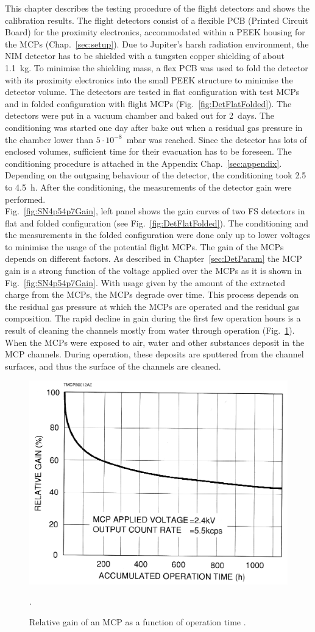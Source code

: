 	This chapter describes the testing procedure of the flight detectors and shows the calibration results. The flight detectors consist of a flexible PCB (Printed Circuit Board) for the proximity electronics, accommodated within a PEEK housing for the MCPs (Chap.~\ref{sec:setup}). Due to Jupiter's harsh radiation environment, the NIM detector has to be shielded with a tungsten copper shielding of about 1.1~kg. To minimise the shielding mass, a flex PCB was used to fold the detector with its proximity electronics into the small PEEK structure to minimise the detector volume. The detectors are tested in flat configuration with test MCPs and in folded configuration with flight MCPs (Fig.~\ref{fig:DetFlatFolded}). The detectors were put in a vacuum chamber and baked out for 2~days. The conditioning was started one day after bake out when a residual gas pressure in the chamber lower than $5\cdot10^{-8}$~mbar was reached. Since the detector has lots of enclosed volumes, sufficient time for their evacuation has to be foreseen. The conditioning procedure is attached in the Appendix Chap.~\ref{sec:appendix}. Depending on the outgasing behaviour of the detector, the conditioning took 2.5 to 4.5~h. After the conditioning, the measurements of the detector gain were performed.\\
	Fig.~\ref{fig:SN4p54p7Gain}, left panel shows the gain curves of two FS detectors in flat and folded configuration (see Fig.~\ref{fig:DetFlatFolded}). The conditioning and the measurements in the folded configuration were done only up to lower voltages to minimise the usage of the potential flight MCPs. The gain of the MCPs depends on different factors. As described in Chapter~\ref{sec:DetParam} the MCP gain is a strong function of the voltage applied over the MCPs as it is shown in Fig.~\ref{fig:SN4p54p7Gain}. With usage given by the amount of the extracted charge from the MCPs, the MCPs degrade over time. This process depends on the residual gas pressure at which the MCPs are operated and the residual gas composition. The rapid decline in gain during the first few operation hours is a result of cleaning the channels mostly from water through operation (Fig.~\ref{fig:MCPrelGainTime}). When the MCPs were exposed to air, water and other substances deposit in the MCP channels. During operation, these deposits are sputtered from the channel surfaces, and thus the surface of the channels are cleaned. 
	\begin{figure}[h!] %
		\centering
		\includegraphics[width=.5\textwidth]{Experiments/MCP_relGain_timeevol.png}
		\caption{Relative gain of an MCP as a function of operation time \cite{LecNot_Wurz2017}.}
		\label{fig:MCPrelGainTime}.
	\end{figure}
